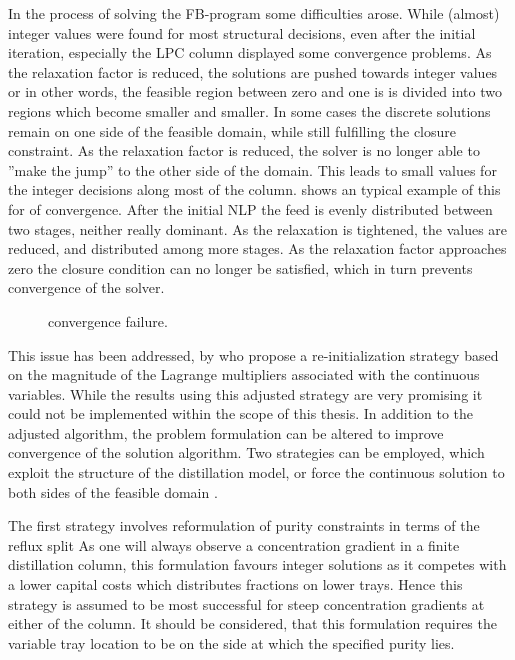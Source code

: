     In the process of solving the FB-program  some difficulties arose. While
    (almost) integer values were found for most structural decisions, even after the initial iteration, especially
    the LPC column displayed some convergence problems. As the relaxation factor is reduced, the solutions are pushed
    towards integer values or in other words, the feasible region between zero and one is is divided into two regions
    which become smaller and smaller. In some cases the discrete solutions remain on one side of the feasible domain,
    while still fulfilling the closure constraint. As the relaxation factor is reduced, the solver is no longer able to
    ''make the jump'' to the other side of the domain. This leads to small values for the integer decisions along most
    of the column.  shows an typical example of this for of convergence. After the initial NLP the
    feed is evenly distributed between two stages, neither really dominant. As the relaxation is tightened, the values
    are reduced, and distributed among more stages. As the relaxation factor approaches zero the closure condition can
    no longer be satisfied, which in turn prevents convergence of the solver.
    \begin{figure}
        \scriptsize
        \center
        
        \caption{convergence failure.}
        \label{fig:conv_fail}
    \end{figure}

    This issue has been addressed, by \cite{Kraemer.2010} who propose a re-initialization strategy based on the magnitude of
    the Lagrange multipliers associated with the continuous variables. While the results using this adjusted strategy
    are very promising it could not be implemented within the scope of this thesis. In addition to the adjusted algorithm,
    the problem formulation can be altered to improve convergence of the solution algorithm. Two strategies can
    be employed, which exploit the structure of the distillation model, or force the continuous solution to both sides
    of the feasible domain \cite{Kraemer.2009}.

    The first strategy involves reformulation of purity constraints in terms of the reflux split
    As one will always observe a concentration gradient in a finite distillation column, this formulation favours
    integer solutions as it competes with a lower capital costs which distributes fractions on lower trays. Hence
    this strategy is assumed to be most successful for steep concentration gradients at either of the column.
    It should be considered, that this formulation requires the variable tray location to be on the side at which
    the specified purity lies. 

